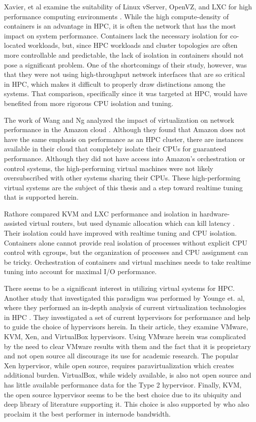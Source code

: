 Xavier, et al examine the suitability of Linux vServer, OpenVZ, and LXC for high performance computing environments \autocite{xavier2013performance}.
While the high compute-density of containers is an advantage in HPC, it is often the network that has the most impact on system performance.
Containers lack the necessary isolation for co-located workloads, but, since HPC workloads and cluster topologies are often more controllable and predictable, the lack of isolation in containers should not pose a significant problem.
One of the shortcomings of their study, however, was that they were not using high-throughput network interfaces that are so critical in HPC, which makes it difficult to properly draw distinctions among the systems.
That comparison, specifically since it was targeted at HPC, would have benefited from more rigorous CPU isolation and tuning.  

The work of Wang and Ng analyzed the impact of virtualization on network performance in the Amazon cloud \autocite{wangAmazon2010}.
Although they found that Amazon does not have the same emphasis on performance as an HPC cluster, there are instances available in their cloud that completely isolate their CPUs for guaranteed performance.  
Although they did not have access into Amazon's orchestration or control systems, the high-performing virtual machines were not likely oversubscribed with other systems sharing their CPUs. 
These high-performing virtual systems are the subject of this thesis and a step toward realtime tuning that is supported herein.  

Rathore compared KVM and LXC performance and isolation in hardware-assisted virtual routers, but used dynamic allocation which can kill latency \autocite{rathore2013kvm}.
Their isolation could have improved with realtime tuning and CPU isolation.  
Containers alone cannot provide real isolation of processes without explicit CPU control with cgroups, but the organization of processes and CPU assignment can be tricky.
Orchestration of containers and virtual machines needs to take realtime tuning into account for maximal I/O performance.

There seems to be a significant interest in utilizing virtual systems for HPC.  Another study that investigated this paradigm was performed by Younge et. al, where they performed an in-depth analysis of current virtualization technologies in HPC \autocite{_younge_1}.
They investigated a set of current hypervisors for performance and help to guide the choice of hypervisors herein. 
In their article, they examine VMware, KVM, Xen, and VirtualBox hypervisors. 
Using VMware herein was complicated by the need to clear VMware results with them and the fact that it is proprietary and not open source all discourage its use for academic research.  
The popular Xen hypervisor, while open source, requires paravirtualization which creates additional burden.
VirtualBox, while widely available, is also not open source and has little available performance data for the Type 2 hypervisor.  
Finally, KVM, the open source hypervisor seems to be the best choice due to its ubiquity and deep library of literature supporting it.
This choice is also supported by \autocite{_younge_1} who also proclaim it the best performer in internode bandwidth.  

